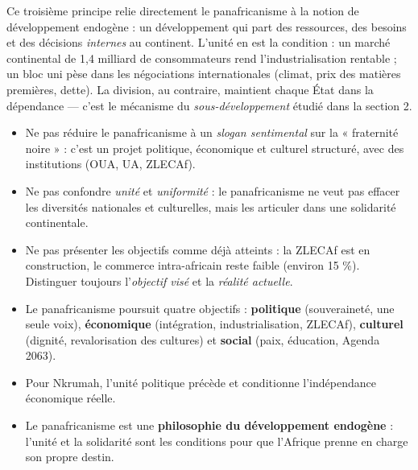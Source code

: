 \documentclass[11pt]{article}
\newcommand{\cle}[1]{{\popxbold\color{popdark}#1}}
\begin{document}
Ce troisième principe relie directement le panafricanisme à la notion de \cle{développement endogène} : un développement qui part des ressources, des besoins et des décisions \emph{internes} au continent. L'unité en est la condition : un marché continental de 1,4 milliard de consommateurs rend l'industrialisation rentable ; un bloc uni pèse dans les négociations internationales (climat, prix des matières premières, dette). La division, au contraire, maintient chaque État dans la dépendance — c'est le mécanisme du \emph{sous-développement} étudié dans la section 2.

\begin{attention}
\begin{itemize}
\item Ne pas réduire le panafricanisme à un \emph{slogan sentimental} sur la « fraternité noire » : c'est un projet politique, économique et culturel structuré, avec des institutions (OUA, UA, ZLECAf).
\item Ne pas confondre \emph{unité} et \emph{uniformité} : le panafricanisme ne veut pas effacer les diversités nationales et culturelles, mais les articuler dans une solidarité continentale.
\item Ne pas présenter les objectifs comme déjà atteints : la ZLECAf est en construction, le commerce intra-africain reste faible (environ 15 \%). Distinguer toujours l'\emph{objectif visé} et la \emph{réalité actuelle}.
\end{itemize}
\end{attention}

\begin{aretenir}
\begin{itemize}
\item Le panafricanisme poursuit quatre objectifs : \textbf{politique} (souveraineté, une seule voix), \textbf{économique} (intégration, industrialisation, ZLECAf), \textbf{culturel} (dignité, revalorisation des cultures) et \textbf{social} (paix, éducation, Agenda 2063).
\item Pour Nkrumah, l'unité politique précède et conditionne l'indépendance économique réelle.
\item Le panafricanisme est une \textbf{philosophie du développement endogène} : l'unité et la solidarité sont les conditions pour que l'Afrique prenne en charge son propre destin.
\end{itemize}
\end{aretenir}
\end{document}
